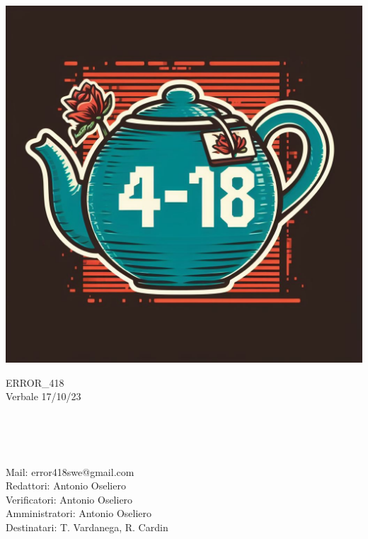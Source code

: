\documentclass[12pt,a4paper]{article}
\begin{document}
\pagecolor{white}
\color{black}

\noindent\begin{minipage}{0.3\textwidth}

    \includegraphics[width=\linewidth]{Logo_Error-418_1.jpeg}
\end{minipage}%
\hfill%
\begin{minipage}{0.6\textwidth}\raggedright
    \huge
    ERROR\_418\\
    Verbale 17/10/23
\end{minipage}
\\
\\
\\
\raggedright \large

Mail: \hspace{3.3cm} error418swe@gmail.com\\
\vspace{4mm} Redattori:
\hspace{2.3cm} Antonio Oseliero\\
\vspace{4mm} Verificatori:
\hspace{2cm} Antonio Oseliero\\
\vspace{4mm} Amministratori:
\hspace{1.1cm} Antonio Oseliero\\
\vspace{4mm} Destinatari:
\hspace{2cm} T. Vardanega, R. Cardin\\
\end{document}
